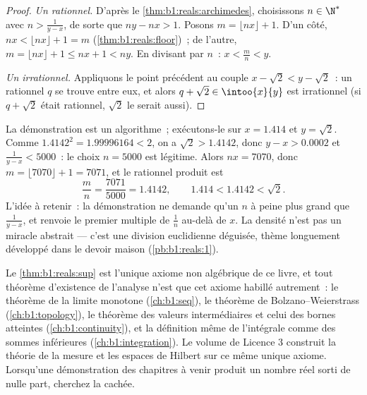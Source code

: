 \begin{proof}
\emph{Un rationnel.} D'après le \cref{thm:b1:reals:archimedes},
choisissons $n \in \N^*$ avec $n > \frac{1}{y - x}$, de sorte que $ny
- nx > 1$. Posons $m = \lfloor nx \rfloor + 1$. D'un côté, $nx <
\lfloor nx \rfloor + 1 = m$ (\cref{thm:b1:reals:floor})~; de l'autre,
$m = \lfloor nx \rfloor + 1 \leq nx + 1 < ny$. En divisant par $n$~:
$x < \frac mn < y$.

\emph{Un irrationnel.} Appliquons le point précédent au couple $x -
\sqrt 2 < y - \sqrt 2$~: un rationnel $q$ se trouve entre eux, et
alors $q + \sqrt 2 \in \intoo{x}{y}$ est irrationnel (si $q + \sqrt
2$ était rationnel, $\sqrt 2$ le serait aussi).
\end{proof}

\begin{example}\label{ex:b1:reals:densityrun}
La démonstration est un algorithme~; exécutons-le sur $x = 1.414$
et $y = \sqrt 2$. Comme $1.4142^2 = 1.99996164 < 2$, on a $\sqrt 2
> 1.4142$, donc $y - x > 0.0002$ et $\frac{1}{y - x} < 5000$~: le
choix $n = 5000$ est légitime. Alors $nx = 7070$, donc $m = \lfloor
7070 \rfloor + 1 = 7071$, et le rationnel produit est
\[
\frac{m}{n} = \frac{7071}{5000} = 1.4142,
\qquad
1.414 < 1.4142 < \sqrt 2 .
\]
L'idée à retenir~: la démonstration ne demande qu'un $n$ à peine
plus grand que $\frac{1}{y-x}$, et renvoie le premier multiple de
$\frac 1n$ au-delà de $x$. La densité n'est pas un miracle abstrait
--- c'est une division euclidienne déguisée, thème longuement
développé dans le devoir maison (\cref{pb:b1:reals:1}).
\end{example}

\begin{remark}
Le \cref{thm:b1:reals:sup} est l'unique axiome non algébrique de ce
livre, et tout théorème d'existence de l'analyse n'est que cet
axiome habillé autrement~: le théorème de la limite monotone
(\cref{ch:b1:seq}), le théorème de Bolzano--Weierstrass
(\cref{ch:b1:topology}), le théorème des valeurs intermédiaires et
celui des bornes atteintes (\cref{ch:b1:continuity}), et la
définition même de l'intégrale comme  des sommes
inférieures (\cref{ch:b1:integration}). Le volume de Licence 3
construit la théorie de la mesure et les espaces de Hilbert sur ce
même unique axiome. Lorsqu'une démonstration des chapitres à venir
produit un nombre réel sorti de nulle part, cherchez la  cachée.
\end{remark}

